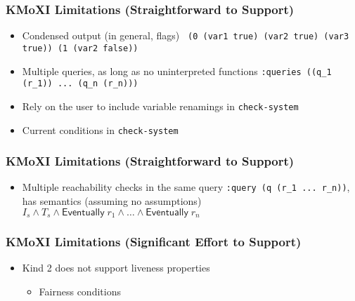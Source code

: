 \documentclass[11pt,xcolor={dvipsnames},hyperref={pdftex,pdfpagemode=UseNone,hidelinks,pdfdisplaydoctitle=true},usepdftitle=false]{beamer}
\newcommand{\code}[1]{{\footnotesize\texttt{#1}}}
\begin{document}
\begin{frame}
    \frametitle{KMoXI Limitations (Straightforward to Support)}
    \begin{itemize}
        \item Condensed output (in general, flags) \newline 
        {\footnotesize \texttt {
                (0 (var1 true) (var2 true) (var3 true)) \newline
                (1 (var2 false))}} \pause 
        \item Multiple queries, as long as no uninterpreted functions \newline 
        {\footnotesize \texttt {:queries ((q\_1 (r\_1)) ... (q\_n (r\_n)))}} \pause
        \item Rely on the user to include variable renamings in \code{check-system} \pause
        \item Current conditions in \code{check-system}
    \end{itemize}
\end{frame}

\begin{frame}
    \frametitle{KMoXI Limitations (Straightforward to Support)}
    \begin{itemize}
        \item Multiple reachability checks in the same query \newline \pause
        \code{:query (q (r\_1 ... r\_n))}\pause, \newline has semantics (assuming no assumptions) \newline 
        $I_s \land T_s \land \mathsf{Eventually}\; r_1 \land \dots \land \mathsf{Eventually}\; r_n$ 
    \end{itemize}
\end{frame}
 
\begin{frame}
    \frametitle{KMoXI Limitations (Significant Effort to Support)}
    \begin{itemize}
        \pause
        \item Kind 2 does not support liveness properties \pause
        \begin{itemize}
        \item Fairness conditions
        \end{itemize}
    \end{itemize}
\end{frame}
\end{document}
